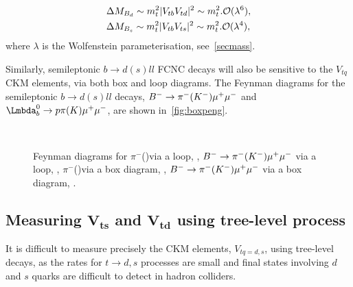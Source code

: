 \begin{equation}
  \begin{split}
    & \Delta M_{{B}_{d}} \sim m_{t}^{2}|{V_{{t}{b}}}{V_{{t}{d}}}|^{2} \sim m_{t}^{2}.\mathcal{O}(\lambda^{6}), \\
    & \Delta M_{{B}_{s}} \sim m_{t}^{2}|{V_{{t}{b}}}{V_{{t}{s}}}|^{2} \sim m_{t}^{2}.\mathcal{O}(\lambda^{4}),
  \end{split}
\end{equation}
where $\lambda$ is the Wolfenstein parameterisation, see~\autoref{secmass}.

Similarly, semileptonic $b\to d(s)ll$ FCNC decays will also be sensitive to the $V_{tq}$ CKM elements, via both box and loop diagrams. The Feynman diagrams for the semileptonic $b\to d(s)ll$ decays, ${B}^{-}\rightarrow{\ensuremath{{\pi}^-}}({{K}^-}){\mu^+}{\mu^-}$ and $\Lb\to\proton\pi(\kaon)\mup\mun$, are shown in~\autoref{fig:boxpeng}.   %
\begin{figure}[!h]\def\nh{0.5\textwidth}
  \centering
  \hspace*{-2cm}
  \\
  \hspace*{-2cm}
  \caption{Feynman diagrams for \Lb\to\proton$\pi^{-}$(\Km)\mup\mun via a loop, \protect{}, $B^{-}\rightarrow{\ensuremath{{\pi}^-}}({K}^{-}){\mu^+}{\mu^-}$ via a loop,  \protect{}, \Lb\to\proton$\pi^{-}$(\Km)\mup\mun via a box diagram,
   \protect{}, $B^{-}\rightarrow{\ensuremath{{\pi}^-}}({K}^{-}){\mu^+}{\mu^-}$ via a box diagram, \protect{}.
  }
  \label{fig:boxpeng}
\end{figure}

\subsection[Measuring $V_{ts}$ and $V_{td}$ using tree-level process]{Measuring $\mathbold{V_{ts}}$ and $\mathbold{V_{td}}$ using tree-level process}
It is difficult to measure precisely the CKM elements, $V_{tq=d,s}$, using tree-level decays, as the rates for $t \to d, s$ processes are small and final states involving $d$ and $s$ quarks are difficult to detect in hadron colliders.

